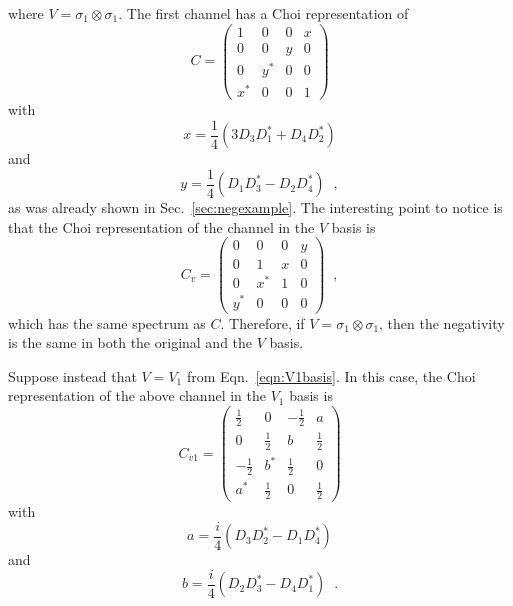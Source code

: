 where $V=\sigma_1\otimes\sigma_1$.  The first channel has a Choi representation of
\begin{equation}
\label{eqn:Obasis}
C = \begin{pmatrix}
1&0&0&x\\
0&0&y&0\\
0&y^*&0&0\\
x^*&0&0&1
\end{pmatrix}
\end{equation}
with
$$
x= \frac{1}{4} \left(3D_3D_1^*+D_4D_2^*\right)
$$
and
$$
y = \frac{1}{4} \left(D_1D_3^*-D_2D_4^*\right)\;\;,
$$
as was already shown in Sec.\ \ref{sec:negexample}.  The interesting point to notice is that the Choi representation of the channel in the $V$ basis is
$$
C_v = \begin{pmatrix}
0&0&0&y\\
0&1&x&0\\
0&x^*&1&0\\
y^*&0&0&0
\end{pmatrix}\;\;,
$$
which has the same spectrum as $C$.  Therefore, if $V=\sigma_1\otimes\sigma_1$, then the negativity is the same in both the original and the $V$ basis.

Suppose instead that $V=V_1$ from Eqn.\ \ref{eqn:V1basis}.  In this case, the Choi representation of the above channel in the $V_1$ basis is
\begin{equation}
\label{eqn:Cbasis}
C_{v1} = \begin{pmatrix}
\frac{1}{2}&0&-\frac{1}{2}&a\\
0&\frac{1}{2}&b&\frac{1}{2}\\
-\frac{1}{2}&b^*&\frac{1}{2}&0\\
a^*&\frac{1}{2}&0&\frac{1}{2}
\end{pmatrix}
\end{equation}
with
$$
a = \frac{i}{4} \left(D_3 D_2^* - D_1 D_4^*\right)
$$
and
$$
b = \frac{i}{4} \left(D_2 D_3^* - D_4 D_1^*\right)\;\;.
$$

